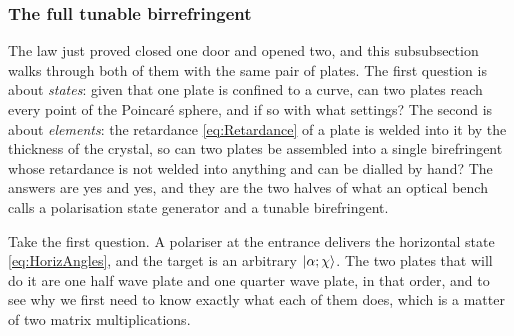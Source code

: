         \subsubsection{The full tunable birrefringent}

            The law just proved closed one door and opened two, and this subsubsection walks through both of them with the same pair of plates. The first question is about \textit{states}: given that one plate is confined to a curve, can two plates reach every point of the Poincaré sphere, and if so with what settings? The second is about \textit{elements}: the retardance \ref{eq:Retardance} of a plate is welded into it by the thickness of the crystal, so can two plates be assembled into a single birefringent whose retardance is not welded into anything and can be dialled by hand? The answers are yes and yes, and they are the two halves of what an optical bench calls a polarisation state generator and a tunable birefringent.

            Take the first question. A polariser at the entrance delivers the horizontal state \ref{eq:HorizAngles}, and the target is an arbitrary $\ket{\alpha;\chi}$. The two plates that will do it are one half wave plate and one quarter wave plate, in that order, and to see why we first need to know exactly what each of them does, which is a matter of two matrix multiplications.


